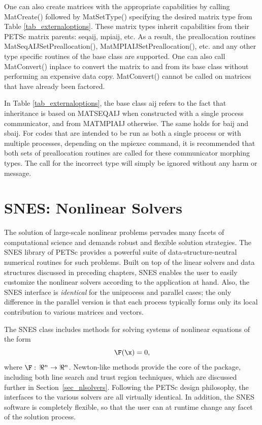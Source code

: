 One can also create matrices with the appropriate
capabilities by calling MatCreate() followed by MatSetType()
specifying the desired matrix type from Table \ref{tab_externaloptions}.
These matrix types inherit capabilities from their PETSc matrix
parents: seqaij, mpiaij, etc.  As a result, the preallocation routines
MatSeqAIJSetPreallocation(), MatMPIAIJSetPreallocation(), etc. and any other type
specific routines of the base class are supported.  One can also
call MatConvert() inplace to convert the matrix to and from its base
class without performing an expensive data copy.  MatConvert() cannot be
called on matrices that have already been factored.

In Table \ref{tab_externaloptions}, the base class aij refers to the fact
that inheritance is based on MATSEQAIJ when constructed with a single
process communicator, and from MATMPIAIJ otherwise.  The same holds
for baij and sbaij.  For codes that are intended to be run as both a
single process or with multiple processes, depending on the mpiexec
command, it is recommended that both sets of preallocation routines
are called for these communicator morphing types.  The call for the
incorrect type will simply be ignored without any harm or message.


\cleardoublepage
\chapter{SNES: Nonlinear Solvers}
\label{chapter_snes}

The solution of large-scale nonlinear problems pervades many facets of
computational science and demands robust and flexible solution
strategies. The SNES library of PETSc provides a powerful suite of
data-structure-neutral numerical routines for such problems.  Built on
top of the linear solvers and data structures discussed in preceding
chapters, SNES enables the user to easily customize the nonlinear
solvers according to the application at hand.  Also, the SNES
interface is {\em identical} for the uniprocess and parallel cases;
the only difference in the parallel version is that each process
typically forms only its local contribution to various matrices and
vectors.

The SNES class includes methods for solving systems of nonlinear equations of the form
\begin{equation}
\F(\x) = 0,
\label{eq_F=0}
\end{equation}
where $\F: \, \Re^n \to \Re^n$.
Newton-like methods provide the core of the package, including
 both line search 
and trust region  techniques, which are discussed
further in Section~\ref{sec_nlsolvers}. Following the
PETSc design philosophy, the interfaces to the various solvers are all
virtually identical. In addition, the SNES software is completely
flexible, so that the user can at runtime change any facet of the
solution process.

